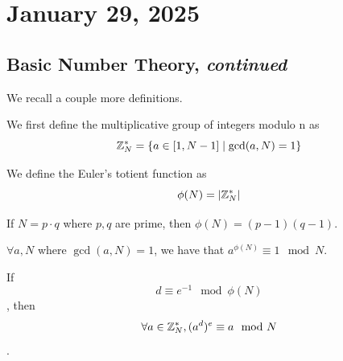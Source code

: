 \section{January 29, 2025}
\label{20250129}

\subsection{Basic Number Theory, \emph{continued}}

We recall a couple more definitions.

\begin{definition}
    We first define the multiplicative group of integers modulo n as
    $$\mathbb Z_N^* = \{a\in [1, N-1]\mid \gcd(a, N) = 1\}$$
\end{definition}

\begin{definition}
    We define the Euler's totient function as
    $$\phi(N) = |\mathbb Z_N^*|$$
\end{definition}

\begin{example}
    If $N = p \cdot q$ where $p, q$ are prime, then $\phi(N) = (p-1)(q-1)$.
\end{example}

\begin{theorem}
    $\forall a, N$ where $\gcd(a, N) = 1$, we have that $a^{\phi(N)} \equiv 1 \mod N$.
\end{theorem}

\begin{corollary}
    If $$d \equiv e^{-1} \mod \phi(N)$$, then $$\forall a \in \mathbb Z_N^*, (a^d)^e \equiv a \mod N$$.
\end{corollary}


